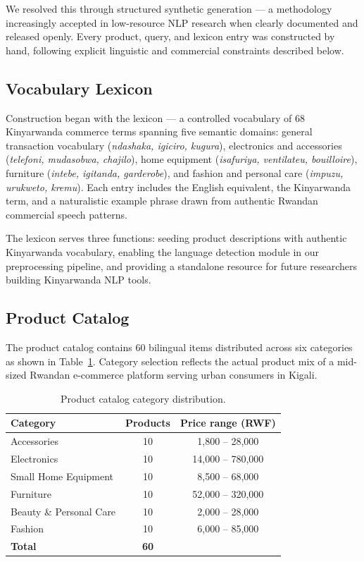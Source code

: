 \documentclass[11pt,a4paper]{article}
\begin{document}
We resolved this through structured synthetic generation — a methodology
increasingly accepted in low-resource NLP research \citep{longpre2023}
when clearly documented and released openly. Every product, query, and
lexicon entry was constructed by hand, following explicit linguistic and
commercial constraints described below.

\subsection{Vocabulary Lexicon}

Construction began with the lexicon — a controlled vocabulary of 68
Kinyarwanda commerce terms spanning five semantic domains: general
transaction vocabulary (\textit{ndashaka, igiciro, kugura}), electronics
and accessories (\textit{telefoni, mudasobwa, chajilo}), home equipment
(\textit{isafuriya, ventilateu, bouilloire}), furniture (\textit{intebe,
igitanda, garderobe}), and fashion and personal care (\textit{impuzu,
urukweto, kremu}). Each entry includes the English equivalent, the
Kinyarwanda term, and a naturalistic example phrase drawn from authentic
Rwandan commercial speech patterns.

The lexicon serves three functions: seeding product descriptions with
authentic Kinyarwanda vocabulary, enabling the language detection module
in our preprocessing pipeline, and providing a standalone resource for
future researchers building Kinyarwanda NLP tools.

\subsection{Product Catalog}

The product catalog contains 60 bilingual items distributed across six
categories as shown in Table~\ref{tab:catalog}. Category selection reflects
the actual product mix of a mid-sized Rwandan e-commerce platform serving
urban consumers in Kigali.

\begin{table}[H]
\centering
\caption{Product catalog category distribution.}
\label{tab:catalog}
\begin{tabular}{lcc}
\toprule
\textbf{Category} & \textbf{Products} & \textbf{Price range (RWF)} \\
\midrule
Accessories           & 10 & 1,800 -- 28,000  \\
Electronics           & 10 & 14,000 -- 780,000 \\
Small Home Equipment  & 10 & 8,500 -- 68,000  \\
Furniture             & 10 & 52,000 -- 320,000 \\
Beauty \& Personal Care & 10 & 2,000 -- 28,000 \\
Fashion               & 10 & 6,000 -- 85,000  \\
\midrule
\textbf{Total}        & \textbf{60} & \\
\bottomrule
\end{tabular}
\end{table}
\end{document}
